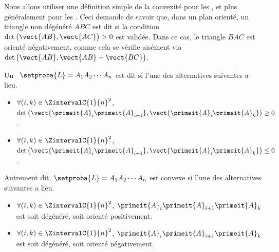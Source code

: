 Nous allons utiliser une définition simple de la convexité pour les \ngones, et plus généralement pour les \ncycles. Ceci demande de savoir que, dans un plan orienté, un triangle non dégénéré $ABC$ est dit  si la condition $\det \big( \vect{AB} , \vect{AC} \big) > 0$ est validée. Dans ce cas, le triangle $BAC$ est orienté négativement, comme cela se vérifie aisément via $\det \big( \vect{AB} , \vect{AB} + \vect{BC} \big)$.




\begin{defi} \label{ncycle-def}
	Un \ncycle\ $\setproba{L} = A_1 A_2 \cdots A_n$ est dit  si  l'une des alternatives suivantes a lieu.
	\begin{itemize}
		\item $\forall (i, k) \in \ZintervalC{1}{n}^2$,
		$\det \big( \vect{\primeit{A}_i \primeit{A}_{i+1}}, \vect{\primeit{A}_i \primeit{A}_k} \big) \geq 0$.

		\item $\forall (i, k) \in \ZintervalC{1}{n}^2$,
		$\det \big( \vect{\primeit{A}_i \primeit{A}_{i+1}}, \vect{\primeit{A}_i \primeit{A}_k} \big) \leq 0$.
    \end{itemize}
	
	Autrement dit, $\setproba{L} = A_1 A_2 \cdots A_n$ est convexe si l'une des alternatives suivantes a lieu.
	\begin{itemize}
		\item $\forall (i, k) \in \ZintervalC{1}{n}^2$,
		$\primeit{A}_i \primeit{A}_{i+1} \primeit{A}_k$ est soit dégénéré, soit  orienté positivement.

		\item $\forall (i, k) \in \ZintervalC{1}{n}^2$,
		$\primeit{A}_i \primeit{A}_{i+1} \primeit{A}_k$ est soit dégénéré, soit  orienté négativement.
    \end{itemize}
\end{defi}


